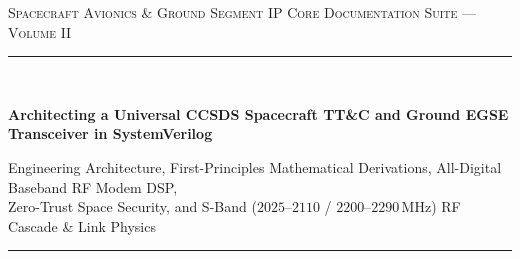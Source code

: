 \documentclass[10pt,a4paper]{article}
\renewcommand{\_}{\origunderscore\penalty0\hskip0pt\relax}
\numberwithin{equation}{section}
\numberwithin{table}{section}
\numberwithin{figure}{section}
\begin{document}
\begin{titlepage}
  \centering
  \vspace*{0.20in}
  {\scshape\large\textcolor{accent}{Spacecraft Avionics \& Ground Segment IP Core Documentation Suite --- Volume II}\par}
  \vspace{0.15in}
  \rule{\textwidth}{1.5pt}\\[0.20in]
  {\Huge\bfseries\sffamily\textcolor{primary} Architecting a Universal CCSDS Spacecraft TT\&C and Ground EGSE Transceiver in SystemVerilog\par}
  \vspace{0.14in}
  {\large\sffamily\textcolor{slate} Engineering Architecture, First-Principles Mathematical Derivations, All-Digital Baseband RF Modem DSP,\\Zero-Trust Space Security, and S-Band ($2025\text{--}2110$ / $2200\text{--}2290\,\text{MHz}$) RF Cascade \& Link Physics\par}
  \vspace{0.14in}
  \rule{\textwidth}{1.5pt}\\[0.20in]


\end{titlepage}
\end{document}
